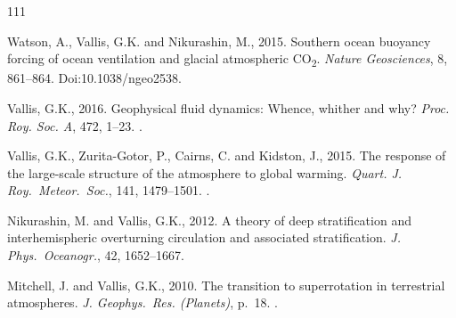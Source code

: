 \documentclass[11pt]{article}
\begin{document}
\begin{thebibliography}{111}
                
        Watson, A., Vallis, G.K. and Nikurashin, M., 2015.
        \newblock Southern ocean buoyancy forcing of ocean ventilation and glacial
          atmospheric {CO}\textsubscript2.
        \newblock \emph{Nature Geosciences}, 8, 861--864.
        \newblock Doi:10.1038/ngeo2538.
        
    Vallis, G.K., 2016.
    \newblock Geophysical fluid dynamics: {Whence}, whither and why?
    \newblock \emph{Proc. Roy. Soc. A}, 472, 1--23.
    \newblock {}.
    
    Vallis, G.K., Zurita-Gotor, P., Cairns, C. and Kidston, J., 2015.
    \newblock The response of the large-scale structure of the atmosphere to global
      warming.
    \newblock \emph{Quart. J. Roy.\ Meteor.\ Soc.}, 141, 1479--1501.
    \newblock {}.

Nikurashin, M. and Vallis, G.K., 2012.
\newblock A theory of deep stratification and interhemispheric overturning
  circulation and associated stratification.
\newblock \emph{J. Phys.\ Oceanogr.}, 42, 1652--1667.

Mitchell, J. and Vallis, G.K., 2010.
\newblock The transition to superrotation in terrestrial atmospheres.
\newblock \emph{J. Geophys.\ Res. (Planets)}, p.~18.
\newblock {}.

  


  
  

\end{thebibliography}
  
\end{document}
